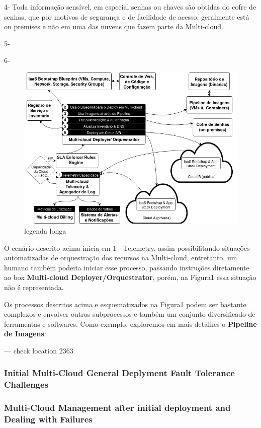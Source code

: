 \documentclass[12pt]{article}
\begin{document}
	4- Toda informação sensível, em especial senhas ou chaves são obtidas do cofre de senhas, que por motivos de segurança e de facilidade de acesso, geralmente está on premises e não em uma das nuvens que fazem parte da Multi-cloud.   
	
	5- 
	
	6- 
	
		\begin{figure}[H]
			\centering
			\includegraphics[width=0.9\linewidth]{Figure1.png}
			\caption{legenda longa}
			\label{fig:figure1}
		\end{figure}

	O cenário descrito acima inicia em 1 - Telemetry, assim possibilitando situações automatizadas de orquestração dos recursos na Multi-cloud, entretanto, um humano também poderia iniciar esse processo, passando instruções diretamente ao box \textbf{Multi-cloud Deployer/Orquestrator}, porém, na Figura1 essa situação não é representada.  
	
	Os processos descritos acima e esquematizados na Figura1 podem ser bastante complexos e envolver outros subprocessos e também um conjunto diversificado de ferramentas e softwares. Como exemplo, exploremos em mais detalhes o \textbf{Pipeline de Imagens}:
	
	--- check location 2363

	\subsubsection{Initial Multi-Cloud General Deplyment Fault Tolerance Challenges}
	
	\subsubsection{Multi-Cloud Management after initial deployment and Dealing with Failures}
	
\end{document}
